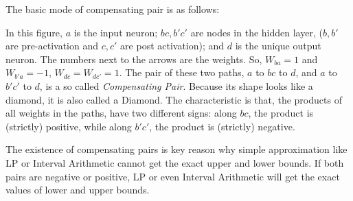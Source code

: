 \documentclass{llncs}
\newcommand{\ReLU}{\mathrm{ReLU}}
\begin{document}
The basic mode of compensating pair is as follows:

\vspace*{2ex}


\vspace*{2ex}

In this figure, $a$ is the input neuron; $bc,b'c'$ are nodes in the hidden layer, ($b,b'$ are pre-activation and $c,c'$ are post activation); and $d$ is the unique output neuron. The numbers next to the arrows are the weights. So, $W_{ba}=1$ and $W_{b'a}=-1$, $W_{dc}=W_{dc'}=1$. The pair of these two paths, $a$ to $bc$ to $d$, and $a$ to $b'c'$ to $d$, is a so called \emph{Compensating Pair}. Because its shape looks like a diamond, it is also called a Diamond. The characteristic is that, the products of all weights in the paths, have two different signs: along $bc$, the product is (strictly) positive, while along $b'c'$, the product is (strictly) negative. 

The existence of compensating pairs is key reason why simple approximation like LP or Interval Arithmetic cannot get the exact upper and lower bounds. If both pairs are negative or positive, LP or even Interval Arithmetic will get the exact values of lower and upper bounds.
\end{document}
